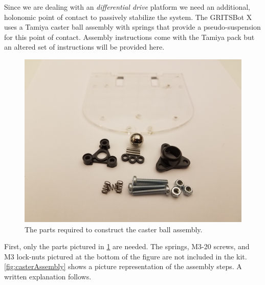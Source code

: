 Since we are dealing with an \emph{differential drive} platform we need an additional, holonomic point of contact to passively stabilize the system. The GRITSBot X uses a Tamiya caster ball assembly with springs that provide a pseudo-suspension for this point of contact. Assembly instructions come with the Tamiya pack but an altered set of instructions will be provided here.

\begin{figure}[h!]
\centering
\includegraphics[width=0.65\columnwidth, keepaspectratio]{./figs/20181219_114555.jpg}
\caption{The parts required to construct the caster ball assembly.}
\label{fig:casterParts}
\end{figure}

First, only the parts pictured in \cref{fig:casterParts} are needed. The springs, M3-20 screws, and M3 lock-nuts pictured at the bottom of the figure are not included in the kit. \cref{fig:casterAssembly} shows a picture representation of the assembly steps. A written explanation follows.

